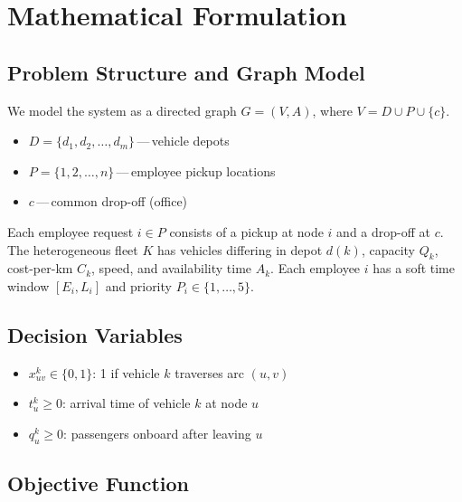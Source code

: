\documentclass[11pt,a4paper]{article}
\begin{document}
\section{Mathematical Formulation}

\subsection{Problem Structure and Graph Model}

We model the system as a directed graph $G = (V, A)$, where $V = D \cup P \cup \{c\}$.

\begin{instancebox}
\begin{itemize}[nosep, leftmargin=1.2em]
    \item $D = \{d_1, d_2, \dots, d_m\}$\,---\,vehicle depots
    \item $P = \{1, 2, \dots, n\}$\,---\,employee pickup locations
    \item $c$\,---\,common drop-off (office)
\end{itemize}
\end{instancebox}

Each employee request $i \in P$ consists of a pickup at node $i$ and a drop-off at $c$. The heterogeneous fleet $K$ has vehicles differing in depot $d(k)$, capacity $Q_k$, cost-per-km $C_k$, speed, and availability time $A_k$. Each employee $i$ has a soft time window $[E_i, L_i]$ and priority $P_i \in \{1,\dots,5\}$.

\subsection{Decision Variables}

\vspace{-4pt}
\begin{itemize}[nosep, leftmargin=1.2em]
    \item $x_{uv}^k \in \{0,1\}$: 1 if vehicle $k$ traverses arc $(u,v)$
    \item $t_u^k \ge 0$: arrival time of vehicle $k$ at node $u$
    \item $q_u^k \ge 0$: passengers onboard after leaving $u$
\end{itemize}

\subsection{Objective Function}
\end{document}
